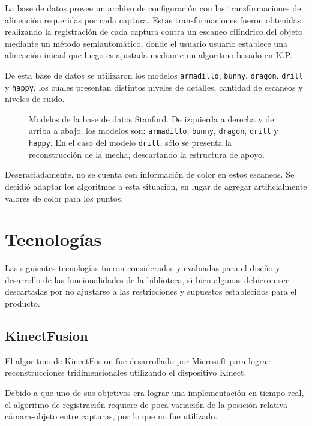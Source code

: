 La base de datos provee un archivo de configuración con las transformaciones de
alineación requeridas por cada captura.
Estas transformaciones fueron obtenidas realizando la registración de cada captura
contra un escaneo cilíndrico del objeto mediante un método semiautomático, donde el usuario
usuario establece una alineación inicial que luego es ajustada mediante un algoritmo
basado en ICP\cite{Turk:1994:ZPM:192161.192241}.

De esta base de datos se utilizaron los modelos
	\texttt{armadillo},
	\texttt{bunny},
	\texttt{dragon},
	\texttt{drill} y
	\texttt{happy},
los cuales presentan distintos niveles de detalles, cantidad de escaneos y niveles de ruido.


\begin{figure}
	\caption{\label{fig:stanford_models}Modelos de la base de datos Stanford.
		De izquierda a derecha y de arriba a abajo, los modelos son:
		\texttt{armadillo},
		\texttt{bunny},
		\texttt{dragon},
		\texttt{drill}
		y \texttt{happy}.
		En el caso del modelo \texttt{drill}, sólo se presenta la reconstrucción de la mecha, descartando la estructura de apoyo.}
\end{figure}


Desgraciadamente, no se cuenta con información de color en estos escaneos.
Se decidió adaptar los algoritmos a esta situación, en lugar de agregar
artificialmente valores de color para los puntos.


\section{Tecnologías}
Las siguientes tecnologías fueron consideradas y evaluadas
para el diseño y desarrollo de las funcionalidades de la biblioteca,
si bien algunas debieron ser descartadas por no ajustarse a las restricciones
y supuestos establecidos para el producto.

	\subsection{KinectFusion}
El algoritmo de KinectFusion fue desarrollado por Microsoft
para lograr reconstrucciones tridimensionales utilizando el dispositivo Kinect.

	Debido a que uno de sus objetivos era lograr una implementación en tiempo
	real, el algoritmo de registración requiere de poca variación
	de la posición relativa cámara-objeto entre capturas, por lo que no fue utilizado.

